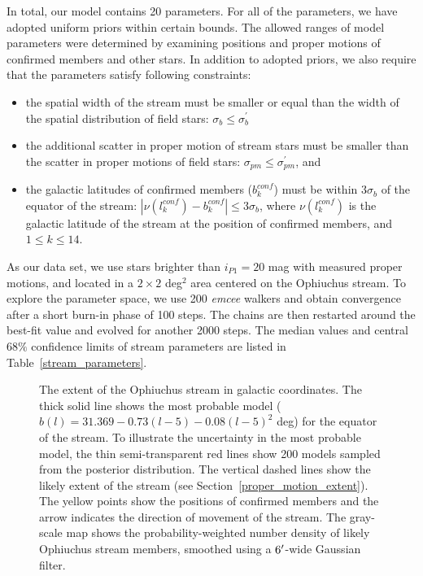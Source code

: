 \documentclass[iop]{emulateapj}
\begin{document}
In total, our model contains 20 parameters. For all of the parameters, we have
adopted uniform priors within certain bounds. The allowed ranges of model
parameters were determined by examining positions and proper motions of
confirmed members and other stars. In addition to adopted priors, we also
require that the parameters satisfy following constraints:
\begin{itemize}
\item the spatial width of the stream must be smaller or equal than the width of
the spatial distribution of field stars: $\sigma_b \leq \sigma^\prime_b$
\item the additional scatter in proper motion of stream stars must be smaller
than the scatter in proper motions of field stars:
$\sigma_{pm} \leq \sigma^\prime_{pm}$, and
\item the galactic latitudes of confirmed members ($b^{conf}_k$) must be within
$3\sigma_b$ of the equator of the stream:
$|\nu(l^{conf}_k) - b^{conf}_k| \leq 3\sigma_b$,
where $\nu(l^{conf}_k)$ is the galactic latitude of the stream at the position
of confirmed members, and $1 \leq k \leq 14$.
\end{itemize}

As our data set, we use stars brighter than $i_{P1}=20$ mag with measured proper
motions, and located in a $2\times2$ deg$^2$ area centered on the Ophiuchus
stream. To explore the parameter space, we use 200 {\em emcee} walkers and
obtain convergence after a short burn-in phase of 100 steps. The chains are then
restarted around the best-fit value and evolved for another 2000 steps. The
median values and central $68\%$ confidence limits of stream parameters are
listed in Table~\ref{stream_parameters}.

\begin{figure}
\caption{
The extent of the Ophiuchus stream in galactic coordinates. The thick solid line
shows the most probable model ($b(l)=31.369-0.73(l-5)-0.08(l-5)^2$ deg) for the
equator of the stream. To illustrate the uncertainty in the most probable
model, the thin semi-transparent red lines show 200 models sampled from the
posterior distribution. The vertical dashed lines show the likely extent of the
stream (see Section~\ref{proper_motion_extent}). The yellow points show the
positions of confirmed members and the arrow indicates the direction of movement
of the stream. The gray-scale map shows the probability-weighted number density
of likely Ophiuchus stream members, smoothed using a $6\mbox{$^\prime$}$-wide Gaussian
filter.
\label{gl_vs_gb_track}}
\end{figure}
\end{document}
